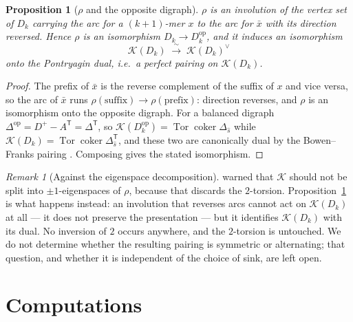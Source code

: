 \documentclass[11pt]{article}
\theoremstyle{plain}
\newtheorem{proposition}[theorem]{Proposition}
\theoremstyle{definition}
\theoremstyle{remark}
\newtheorem{remark}[theorem]{Remark}
\newcommand{\K}{\mathcal{K}}
\newcommand{\coker}{\operatorname{coker}}
\begin{document}
\begin{proposition}[$\rho$ and the opposite digraph]\label{prop:rho}
$\rho$ is an involution of the vertex set of $D_k$ carrying the arc for a $(k{+}1)$-mer
$x$ to the arc for $\bar x$ with its direction reversed. Hence $\rho$ is an isomorphism
$D_k\to D_k^{\mathrm{op}}$, and it induces an isomorphism
\[
\K(D_k)\;\xrightarrow{\ \sim\ }\;\K(D_k)^{\vee}
\]
onto the Pontryagin dual, i.e.\ a perfect pairing on $\K(D_k)$.
\end{proposition}

\begin{proof}
The prefix of $\bar x$ is the reverse complement of the suffix of $x$ and vice versa, so
the arc of $\bar x$ runs $\rho(\text{suffix})\to\rho(\text{prefix})$: direction reverses,
and $\rho$ is an isomorphism onto the opposite digraph. For a balanced digraph
$\Delta^{\mathrm{op}}=D^{+}-A^{\mathsf T}=\Delta^{\mathsf T}$, so
$\K(D_k^{\mathrm{op}})=\operatorname{Tor}\coker\Delta_{\hat s}$ while
$\K(D_k)=\operatorname{Tor}\coker\Delta_{\hat s}^{\mathsf T}$, and these two are
canonically dual by the Bowen--Franks pairing \cite[Lem.~1.5]{ANCFT8}. Composing gives the
stated isomorphism.
\end{proof}

\begin{remark}[Against the eigenspace decomposition]\label{rem:nosplit}
\cite[Open (c)]{Bio1} warned that $\K$ should not be split into $\pm1$-eigenspaces of
$\rho$, because that discards the $2$-torsion. Proposition~\ref{prop:rho} is what happens
instead: an involution that reverses arcs cannot act on $\K(D_k)$ at all --- it does not
preserve the presentation --- but it identifies $\K(D_k)$ with its dual. No inversion of
$2$ occurs anywhere, and the $2$-torsion is untouched. We do not determine whether the
resulting pairing is symmetric or alternating; that question, and whether it is
independent of the choice of sink, are left open.
\end{remark}

\section{Computations}\label{sec:comp}
\end{document}
